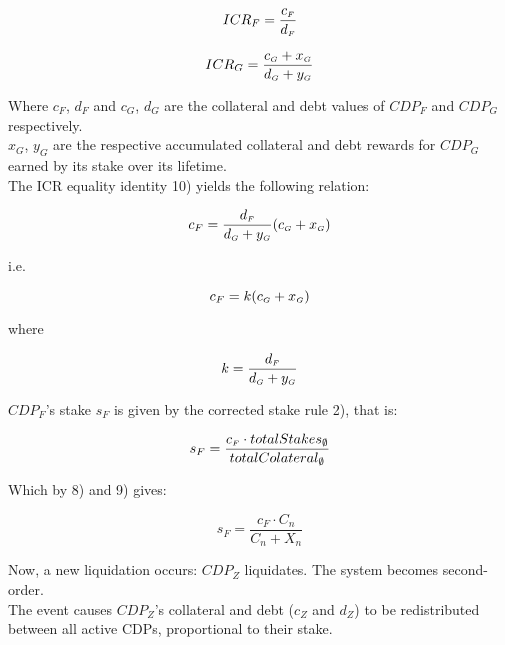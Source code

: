 \documentclass[reqno]{article}
\begin{document}
\begin{equation} 
    ICR_F=\frac{c_\mathsmaller{F}}{d_\mathsmaller{F}}
\end{equation}

\begin{equation} 
    ICR_G=\frac{c_\mathsmaller{G}+x_\mathsmaller{G}}{d_\mathsmaller{G}+y_\mathsmaller{G}}
\end{equation}

\bigskip
Where $c_F$, $d_F$ and $c_G$, $d_G$ are the collateral and debt values of $CDP_F$ and $CDP_G$ respectively.\\

$x_G$, $y_G$ are the respective accumulated collateral and debt rewards for $CDP_G$ earned by its stake over its lifetime.\\

The ICR equality identity 10) yields the following relation:

\begin{equation} 
        c_F=\frac{d_\mathsmaller{F}}{d_\mathsmaller{G}+y_\mathsmaller{G}}(c_\mathsmaller{G}+x_\mathsmaller{G})
\end{equation}

\bigskip
i.e.

\begin{equation} 
    c_F=k(c_\mathsmaller{G}+x_\mathsmaller{G})
\end{equation}

\bigskip
where

\begin{equation} 
    k=\frac{d_\mathsmaller{F}}{d_\mathsmaller{G}+y_\mathsmaller{G}}
\end{equation}

\bigskip
$CDP_F$’s stake $s_F$ is given by the corrected stake rule 2), that is:

\begin{equation} 
    s_F=\frac{c_\mathsmaller{F} \cdot totalStakes_\emptyset}{totalColateral_\emptyset}
\end{equation}

\bigskip
Which by 8) and 9) gives:

\begin{equation} 
    s_F=\frac{c_F \cdot C_n}{C_n+X_n}
\end{equation}

\bigskip
Now, a new liquidation occurs: $CDP_Z$ liquidates. The system becomes second-order.\\

The event causes $CDP_Z$’s collateral and debt ($c_Z$ and $d_Z$) to be redistributed between all active CDPs, proportional to their stake.\\
\end{document}
